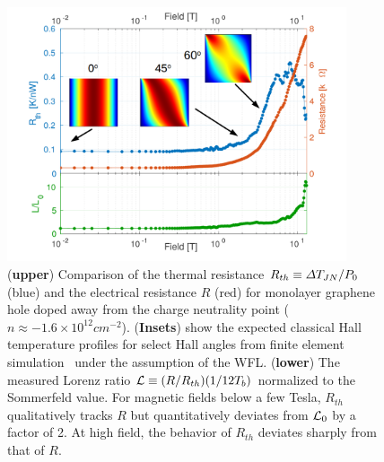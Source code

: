 \begin{figure}
\centering
\includegraphics[width=100mm]{figures/magneto/High_density.png}
\caption{(\textbf{upper}) Comparison of the thermal resistance $R_{th}\equiv \Delta T_{JN}/P_0$ (blue) and the electrical resistance $R$ (red) for monolayer graphene hole doped away from the charge neutrality point ($n\approx-1.6\times10^{12}cm^{-2}$). (\textbf{Insets}) show the expected classical Hall temperature profiles for select Hall angles from finite element simulation~\cite{noauthor_comsol_2017} under the assumption of the WFL. (\textbf{lower}) The measured Lorenz ratio $\mathcal{L} \equiv (R/R_{th})(1/12T_b)$ normalized to the Sommerfeld value. For magnetic fields below a few Tesla, $R_{th}$ qualitatively tracks $R$ but quantitatively deviates from $\mathcal{L}_0$ by a factor of 2. At high field, the behavior of $R_{th}$ deviates sharply from that of $R$.}
\label{fig:m_high_density}
\end{figure}

